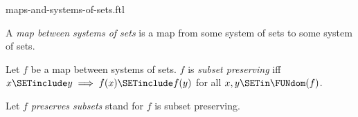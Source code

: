 \documentclass{stex}
\begin{document}
\begin{smodule}{maps-and-systems-of-sets.ftl}

\begin{definition}[forthel,id=FOUNDATIONS_10_1394550966845440]
  A \emph{map between systems of sets} is a map from some system of sets to some system of sets.
\end{definition}

\begin{definition}[forthel,id=FOUNDATIONS_10_3290499861446656]
  Let $f$ be a map between systems of sets.
  $f$ is \emph{subset preserving} iff $x \SETinclude y \implies f(x) \SETinclude f(y)$ for all $x, y \SETin \FUNdom(f)$.

  Let $f$ \emph{preserves subsets} stand for $f$ is subset preserving.
\end{definition}
\end{smodule}
\end{document}
